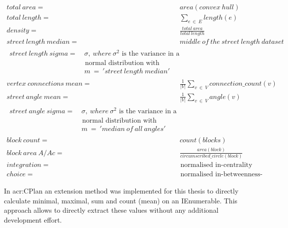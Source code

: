 \begin{align}
    total\ area ={}&\ area(convex\ hull)  \\
    total\ length ={}&\ \sum_{e\ \in\ E}{} length(e)\  \\
    density ={}&\ \frac{total\ area}{total\ length} \\
    street\ length\ median ={}&\ middle\ of\ the\ street\ length\ dataset \\
    \begin{split}
        street\ length\ sigma ={}&\ \sigma,\ where\ \sigma^2\text{ is the variance in a } \\
            &\text{ normal distribution with mean m and } \\
            &\ m\ =\ 'street\ length\ median'
    \end{split} \\
    vertex\ connections\ mean ={}&\ \frac{1}{|V|} \sum_{v\ \in\ V}{} connection\_count(v) \\
    street\ angle\ mean ={}&\ \frac{1}{|V|} \sum_{v\ \in\ V}{} angle(v) \\
    \begin{split}
        street\ angle\ sigma ={}&\ \sigma,\ where\ \sigma^2\text{ is the variance in a } \\
        &\text{ normal distribution with mean m and } \\
        &\ m\ =\ 'median\ of\ all\ angles'
    \end{split} \\
    block\ count ={}&\ count(blocks) \\
    block\ area\ A/Ac ={}&\ \frac{area(block)}{circumscribed\_circle(block)} \label{eq:block_relative_area} \\
    integration ={}&\text{ normalised in-centrality} \\
    choice ={}&\text{ normalised in-betweenness-centrality}
\end{align}

In \acrshort{acr:CPlan} an extension method was implemented for this thesis to directly calculate minimal, maximal, sum and count (mean) on an IEnumerable. This approach allows to directly extract these values without any additional development effort.
